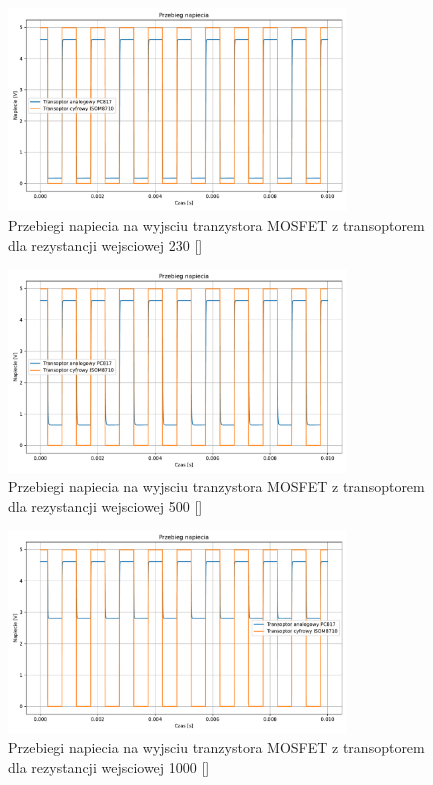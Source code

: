 \documentclass[11pt]{article}
\begin{document}
\begin{figure}[H]
\centering
\includegraphics[width=0.8\textwidth]{aun1_gate_circuit_digital_vs_analog_rin230ohm.pdf}
\caption{Przebiegi napiecia na wyjsciu tranzystora MOSFET z transoptorem dla rezystancji wejsciowej 230 [\Omega]}
\end{figure}

\begin{figure}[H]
\centering
\includegraphics[width=0.8\textwidth]{aun1_gate_circuit_digital_vs_analog_rin500ohm.pdf}
\caption{Przebiegi napiecia na wyjsciu tranzystora MOSFET z transoptorem dla rezystancji wejsciowej 500 [\Omega]}
\end{figure}

\begin{figure}[H]
\centering
\includegraphics[width=0.8\textwidth]{aun1_gate_circuit_digital_vs_analog_rin1000ohm.pdf}
\caption{Przebiegi napiecia na wyjsciu tranzystora MOSFET z transoptorem dla rezystancji wejsciowej 1000 [\Omega]}
\end{figure}
\end{document}
